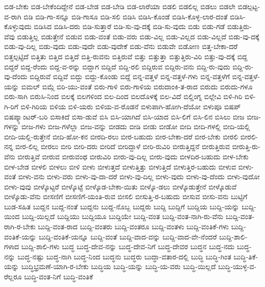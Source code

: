 {ಬಿಡ-ಬೇಕು
ಬಿಡ-ಬೇಕೆಂದಿದ್ದೇನೆ
ಬಿಡ-ಬೇಡ
ಬಿಡ-ಬೇಡಿ
ಬಿಡ-ಲಾರೆಯಾ
ಬಿಡಲಿ
ಬಿಡಲಿಲ್ಲ
ಬಿಡಲು
ಬಿಡಲೇ
ಬಿಡಲ್ಪಟ್ಟ-ವ-ರಾಗಿ
ಬಿಡಿ
ಬಿಡಿ-ಗಾ-ಸನ್ನೂ
ಬಿಡಿ-ಗಾಸೂ
ಬಿಡಿ-ಸಲಿ
ಬಿಡಿಸಿ
ಬಿಡಿಸಿ-ಕೊಂಡೆ
ಬಿಡಿಸಿ-ಕೊಳ್ಳ-ಲಾರ-ದಂತೆ
ಬಿಡಿಸಿ-ಕೊಳ್ಳುವುದು
ಬಿಡಿಸಿದ
ಬಿಡಿಸಿ-ದರು
ಬಿಡಿ-ಸುತ್ತಾರೆ
ಬಿಡಿ-ಸು-ವು-ದಕ್ಕೆ
ಬಿಡಿ-ಸು-ವುದು
ಬಿಡು
ಬಿಡು-ಗಡೆ
ಬಿಡುತ್ತಿರು-ವೆವು
ಬಿಡುತ್ತಿಲ್ಲ
ಬಿಡುತ್ತೇನೆ
ಬಿಡುವ
ಬಿಡು-ವಂತೆ
ಬಿಡು-ವರು
ಬಿಡು-ವಿಲ್ಲ
ಬಿಡು-ವಿಲ್ಲದ
ಬಿಡು-ವಿಲ್ಲದೆ
ಬಿಡು-ವು-ದಕ್ಕೆ
ಬಿಡು-ವು-ದಿಲ್ಲ
ಬಿಡು-ವುದು
ಬಿಡು-ವುದೇ
ಬಿಡು-ವುದೇಕೆ
ಬಿಡು-ವೆನು
ಬಿಡುವೇ
ಬಿಡೋಣ
ಬಿತ್ತ-ಬೇಕಾ-ದರೆ
ಬಿತ್ತಲ್ಪಟ್ಟಿದೆ
ಬಿತ್ತಿತು
ಬಿತ್ತಿದ
ಬಿತ್ತಿದೆ
ಬಿತ್ತಿ-ರುವನು
ಬಿತ್ತಿರುವೆ
ಬಿತ್ತು
ಬಿತ್ತುತ್ತಾ
ಬಿತ್ತುತ್ತಿರು-ವಿರಿ
ಬಿತ್ತು-ವು-ದಕ್ಕೆ
ಬಿದ್ದ
ಬಿದ್ದರೆ
ಬಿದ್ದ-ರೆಂದು
ಬಿದ್ದ-ವ-ರನ್ನು
ಬಿದ್ದಾಗ
ಬಿದ್ದಿದೆ
ಬಿದ್ದಿ-ರಲಿ
ಬಿದ್ದಿರುವ
ಬಿದ್ದಿರು-ವನು
ಬಿದ್ದಿ-ರು-ವುದು
ಬಿದ್ದಿ-ರು-ವು-ದೆಂದು
ಬಿದ್ದಿರುವೆ
ಬಿದ್ದಿವೆ
ಬಿದ್ದು
ಬಿದ್ದು-ಕೊಂಡು
ಬಿದ್ದೆ
ಬಿನ್ನ-ವತ್ತಳೆ
ಬಿನ್ನ-ವತ್ತಳೆ-ಗಳು
ಬಿನ್ನ-ವತ್ತಳೆಗೆ
ಬಿನ್ನ-ವತ್ತಳೆ-ಯನ್ನು
ಬಿಮಲ್
ಬಿಮ್ಗೆ
ಬಿರಿ-ಯು-ವಂತೆ
ಬಿರು-ಗಾಳಿ
ಬಿರು-ಗಾಳಿಯ
ಬಿರುದಾಂಕಿ-ತ-ರಾದ
ಬಿರುದು
ಬಿರುದು-ಗಳೂ
ಬಿರು-ಸಾಗಿ
ಬಿರುಸಿ-ನಿಂದ
ಬಿಲಕ್ಕೆ
ಬಿಲಗಳಿಂದ
ಬಿಲ-ದಿಂದ
ಬಿಲದೊಳಕ್ಕೆ
ಬಿಲ-ವಿದೆ
ಬಿಲ್ಡಿಂಗ್ನ
ಬಿಲ್ಲೇವಿ
ಬಿಳಿ-ಗಿರಿ
ಬಿಳಿ-ಗಿ-ರಿಗೆ
ಬಿಳಿ-ಗಿರಿಯ
ಬಿಳಿಯ
ಬಿಳಿ-ಯರು
ಬಿಳಿಯ-ವ-ರೊಡನೆ
ಬಿಳುಪಾಗಿ-ಹೋಗಿ-ದೆಯೋ
ಬಿಳುಪೂ
ಬಿಷಪ್
ಬಿಷಪ್ಕ್ಯಾಂಟರ್-ಬರಿ
ಬಿಸಾಕಿದೆ
ಬಿಸಾ-ಡುವೆ
ಬಿಸಿ
ಬಿಸಿ-ಯಾಗಿದೆ
ಬಿಸಿ-ಯಾದ
ಬಿಸಿ-ಲಿಗೆ
ಬಿಸಿ-ಲಿನ
ಬಿಸಿಲು
ಬೀಜ
ಬೀಜ-ಗಳನ್ನು
ಬೀಜ-ಗಳು
ಬೀಜ-ಗಳೆಲ್ಲಾ
ಬೀಜ-ವನ್ನು
ಬೀಡದು
ಬೀಡಿ
ಬೀಡು
ಬೀಡೋ
ಬೀದಿ
ಬೀದಿ-ಗಳಲ್ಲಿ
ಬೀದಿ-ಯಲ್ಲಿ
ಬೀದಿ-ಯಲ್ಲಿ-ರುತ್ತೇನೆ
ಬೀದಿ-ಹೋ-ಕನ
ಬೀರದಿ-ರಲು
ಬೀರ-ಬಹುದು
ಬೀರ-ಬೇಕಾ-ದರೆ
ಬೀರ-ಬೇಕು
ಬೀರಲಿ
ಬೀರಲಿ-ನನ್ನ
ಬೀರ-ಲಿಲ್ಲ
ಬೀರಲು
ಬೀರಿ
ಬೀರಿ-ದರು
ಬೀರಿದೆ
ಬೀರಿದ್ದಾಳೆ
ಬೀರಿ-ರುವಿರಿ
ಬೀರುತ್ತಿದ್ದನೆ
ಬೀರುತ್ತಿರುವ
ಬೀರುತ್ತಿ-ರು-ವೆನು
ಬೀರುತ್ತಿವೆ
ಬೀರುವ
ಬೀರುವಂಥ
ಬೀರುವಿರಿ
ಬೀರು-ವು-ದಿಲ್ಲ
ಬೀರು-ವುದು
ಬೀಳದಿರ-ಬಹುದು
ಬೀಳ-ಬೇಕು
ಬೀಳ-ಬೇಡ
ಬೀಳಲಿ
ಬೀಳಲು
ಬೀಳಿ
ಬೀಳು
ಬೀಳುತ್ತದೆ
ಬೀಳುತ್ತಿತ್ತು
ಬೀಳುತ್ತಿದೆ
ಬೀಳುತ್ತಿರ-ಬಹುದು
ಬೀಳುವ
ಬೀಳು-ವಂತೆ
ಬೀಳು-ವನು
ಬೀಳು-ವರು
ಬೀಳು-ವು-ದಾ-ದರೆ
ಬೀಳು-ವು-ದಿಲ್ಲ
ಬೀಳು-ವುದು
ಬೀಳು-ವು-ದೆಂದು
ಬೀಳು-ವುದೋ
ಬೀಳು-ವುವು
ಬೀಳ್ಕೊಟ್ಟರೆ
ಬೀಳ್ಕೊಟ್ಟೆ
ಬೀಳ್ಕೊಡ-ಬೇಕಾ-ಯಿತು
ಬೀಳ್ಕೊ-ಡಲು
ಬೀಳ್ಕೊಡುತ್ತೇನೆ
ಬೀಳ್ಕೊಡುವೆ
ಬೀಳ್ಕೊಡು-ವೆನು
ಬೀಸಣಿಗೆ
ಬೀಸಣಿಗೆ-ಯಂತಿ-ರುವ
ಬೀಸಲಿ
ಬೀಸುತ್ತಿ-ರ-ಬಹುದು
ಬೀಸುವ
ಬೀಸು-ವನು
ಬುಟ್ಟಿಗೆ
ಬುಡ-ಸಹಿತ
ಬುದ್ದನ
ಬುದ್ದ-ನಂತೆ
ಬುದ್ದನು
ಬುದ್ದ-ನೊಬ್ಬ
ಬುದ್ದರು
ಬುದ್ದಿ
ಬುದ್ದಿಗೆ
ಬುದ್ದಿಯ
ಬುದ್ದಿ-ಯನ್ನು
ಬುದ್ದಿ-ಯಿಂದ
ಬುದ್ದಿ-ಯಿಲ್ಲದೆ
ಬುದ್ದಿಯು
ಬುದ್ದಿಯೂ
ಬುದ್ದಿಯೇ
ಬುದ್ದಿ-ವಂತ
ಬುದ್ದಿ-ವಂತ-ನಾಗಿ-ರು-ವೆನು
ಬುದ್ದಿ-ವಂತ-ರಾಗಿ-ರ-ಬೇಕು
ಬುದ್ದಿ-ವಂತ-ರಾದ
ಬುದ್ದಿ-ವಂತರು
ಬುದ್ದಿ-ವಂತರೂ
ಬುದ್ದಿ-ವಂತಳು
ಬುದ್ದಿ-ವಂತಿಕೆ-ಗಳು
ಬುದ್ದಿ-ವಂತಿಕೆ-ಯನ್ನು
ಬುದ್ದಿ-ವಂತಿಕೆ-ಯನ್ನೂ
ಬುದ್ದಿ-ವಂತೆ
ಬುದ್ದಿ-ವಾದ-ವನ್ನು
ಬುದ್ದಿ-ವಾದ-ವೇ-ನೆಂದರೆ
ಬುದ್ದಿ-ಶಾಲಿ-ಗಳಾದ
ಬುದ್ದಿ-ಶಾಲಿ-ಗಳು
ಬುದ್ಧ
ಬುದ್ಧ-ದೇವ-ನನ್ನು
ಬುದ್ಧ-ದೇವ-ನಿಗೆ
ಬುದ್ಧ-ದೇವರ
ಬುದ್ಧನ
ಬುದ್ಧ-ನದು
ಬುದ್ಧ-ನನ್ನು
ಬುದ್ಧ-ನಷ್ಟು
ಬುದ್ಧ-ನಾಗಿ
ಬುದ್ಧ-ನಿಂದ
ಬುದ್ಧನು
ಬುದ್ಧರು
ಬುದ್ಧಾ-ವತಾರ-ದಲ್ಲಿ
ಬುದ್ಧಿ
ಬುದ್ಧಿ-ಗಿಂತ
ಬುದ್ಧಿ-ತಿಕೆ-ಯನ್ನು
ಬುದ್ಧಿಭ್ರಮಣೆ-ಯಾಗಿ-ರ-ಬೇಕು
ಬುದ್ಧಿಯ
ಬುದ್ಧಿ-ಯನ್ನು
ಬುದ್ಧಿ-ಯ-ವರು
ಬುದ್ಧಿ-ಯಿಲ್ಲದೆ
ಬುದ್ಧಿ-ಯುಳ್ಳ-ವ-ರೆಲ್ಲರೂ
ಬುದ್ಧಿ-ವಂತ-ನಿಗೆ
ಬುದ್ಧಿ-ವಂತಿಕೆ
}
